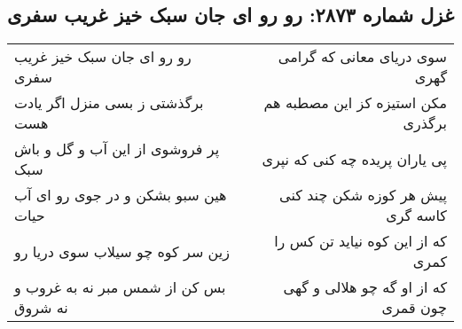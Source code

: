 \begin{center}
\section*{غزل شماره ۲۸۷۳: رو رو ای جان سبک خیز غریب سفری}
\label{sec:2873}
\begin{longtable}{l p{0.5cm} r}
رو رو ای جان سبک خیز غریب سفری
&&
سوی دریای معانی که گرامی گهری
\\
برگذشتی ز بسی منزل اگر یادت هست
&&
مکن استیزه کز این مصطبه هم برگذری
\\
پر فروشوی از این آب و گل و باش سبک
&&
پی یاران پریده چه کنی که نپری
\\
هین سبو بشکن و در جوی رو ای آب حیات
&&
پیش هر کوزه شکن چند کنی کاسه گری
\\
زین سر کوه چو سیلاب سوی دریا رو
&&
که از این کوه نیاید تن کس را کمری
\\
بس کن از شمس مبر نه به غروب و نه شروق
&&
که از او گه چو هلالی و گهی چون قمری
\\
\end{longtable}
\end{center}
